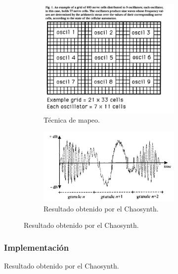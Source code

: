 \documentclass[16pt,spanish]{article}
\begin{document}
\begin{figure}[h!]
\begin{figure}[h!]
\begin{subfigure}[f]{0.5\linewidth}
\includegraphics[width=0.5\linewidth]{imagesCA/mapping_technique.jpg}
\caption{Técnica de mapeo.}
\end{subfigure}
\begin{subfigure}[g]{0.5\linewidth}
\includegraphics[width=0.5\linewidth]{imagesCA/Granular_output.jpg}
\caption{Resultado obtenido por el Chaosynth.}
\end{subfigure}
\end{figure}


\subsubsection{Implementación}


\end{figure}
\end{document}
